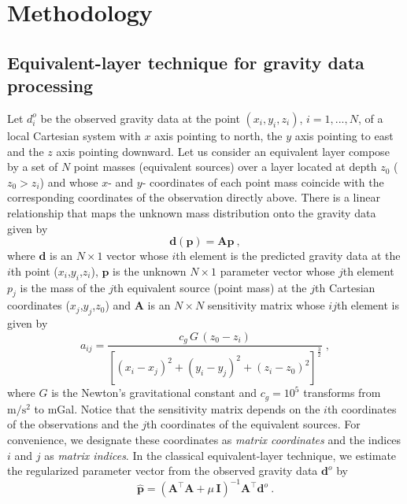 \section{Methodology}

\subsection{Equivalent-layer technique for gravity data processing}

Let $d^{o}_{i}$ be the observed gravity data at
the point $(x_{i}, y_{i}, z_{i})$, $i = 1, ..., N$, of a local Cartesian
system with $x$ axis pointing to north, the $y$ axis pointing to east and 
the $z$ axis pointing downward.
Let us consider an equivalent layer compose by a set of $N$ point masses 
(equivalent sources) over a layer located at depth $z_0$ ($z_0 >z_i$) and whose 
$x$- and $y$- coordinates of each point mass coincide with the corresponding coordinates 
of the observation directly above.
There is a linear relationship that maps the unknown mass distribution onto the gravity 
data given by
\begin{equation}
\mathbf{d}(\mathbf{p}) = \mathbf{A} \mathbf{p} \: ,
\label{eq:predicted-data-vector}
\end{equation}
where $\mathbf{d}$ is an $N \times 1$ vector whose $i$th element is the predicted gravity 
data at the $i$th point ($x_i$,$y_i$,$z_i$), $\mathbf{p}$ is the unknown $N \times 1$ 
parameter vector whose $j$th element $p_j$  is the mass of the $j$th equivalent source 
(point mass) at the $j$th Cartesian coordinates ($x_j$,$y_j$,$z_0$) and $\mathbf{A}$ 
is an $N \times N$  sensitivity matrix whose $ij$th element is given by 
\begin{equation}
a_{ij}= \frac{c_{g} \, G \, (z_{0} - z_{i})}{\left[(x_{i} - x_{j})^{2} +
(y_{i} - y_{j})^{2} +	(z_{i} - z_{0})^{2} \right]^{\frac{3}{2}}} \; ,
\label{eq:aij}
\end{equation}
where $G$ is the Newton's gravitational constant and $c_{g} = 10^{5}$ 
transforms from $\mathrm{m/s^2}$ to mGal.
Notice that the sensitivity matrix depends on the $i$th coordinates of the observations 
and the $j$th coordinates of the equivalent sources. For convenience, we designate 
these coordinates as \textit{matrix coordinates} and the indices $i$ and $j$ as 
\textit{matrix indices}.
In the classical equivalent-layer technique, we estimate the regularized parameter vector 
from the observed gravity data $\mathbf{d}^{o}$ by
\begin{equation}
\hat{\mathbf{p}} = \left( \mathbf{A}^{\top}\mathbf{A} + 
\mu \, \mathbf{I} \right)^{-1}
\mathbf{A}^{\top} \mathbf{d}^{o} \: .
\label{eq:estimated-p-parameter-space}
\end{equation}

